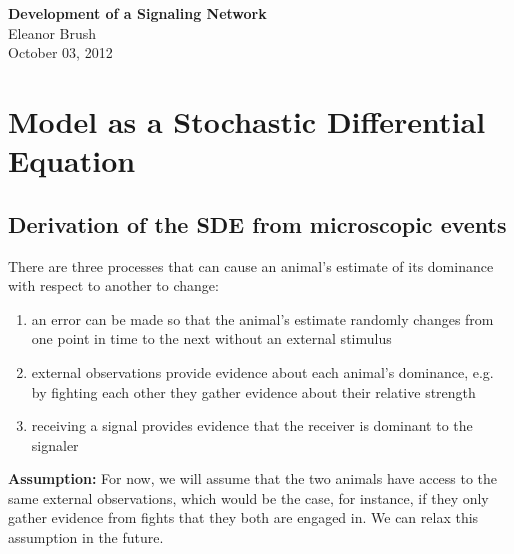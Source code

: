 \documentclass{article}
\begin{document}
\begin{center}
\Large

\end{center}


\vspace{0pt}

\begin{center}
{\bf \LARGE{Development of a Signaling Network}}
\vspace{10pt}
\\ Eleanor Brush
\\ October 03, 2012
\end{center}

\tableofcontents


\vspace{0pt}
\normalsize
\section{Model as a Stochastic Differential Equation}

\subsection{Derivation of the SDE from microscopic events }
There are three processes that can cause an animal's estimate of its dominance with respect to another to change:
\begin{enumerate}
\item an error can be made so that the animal's estimate randomly changes from one point in time to the next without an external stimulus

\item external observations provide evidence about each animal's dominance, e.g. by fighting each other they gather evidence about their relative strength

\item receiving a signal provides evidence that the receiver is dominant to the signaler

\end{enumerate}
{\bf Assumption:} For now, we will assume that the two animals have access to the same external observations, which would be the case, for instance, if they only gather evidence from fights that they both are engaged in.  We can relax this assumption in the future.
\end{document}
